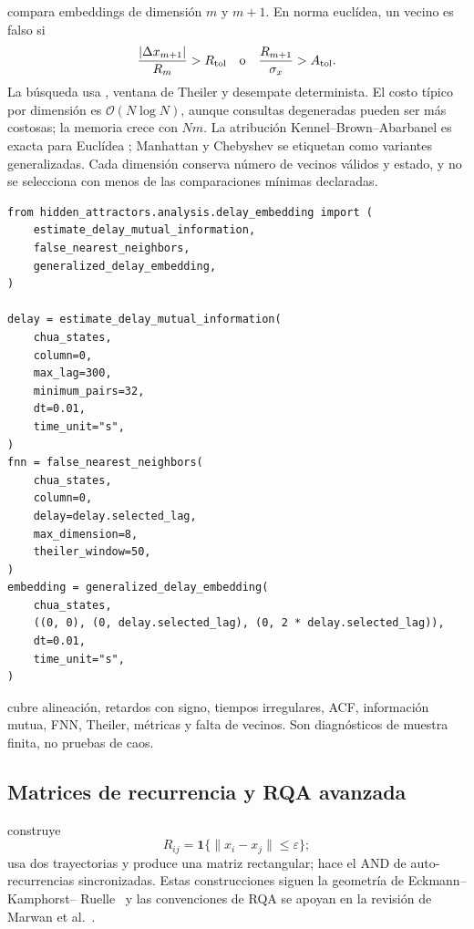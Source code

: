  compara embeddings de dimensión \(m\) y
\(m+1\). En norma euclídea, un vecino es falso si
\[
 \frac{|\Delta x_{m+1}|}{R_m}>R_{\rm tol}
 \quad\text{o}\quad
 \frac{R_{m+1}}{\sigma_x}>A_{\rm tol}.
\]
La búsqueda usa , ventana de Theiler y desempate
determinista. El costo típico por dimensión es \(\mathcal O(N\log N)\), aunque consultas
degeneradas pueden ser más costosas; la memoria crece con \(Nm\). La atribución
Kennel--Brown--Abarbanel es exacta para Euclídea
\cite{KennelEtAl1992}; Manhattan y Chebyshev se etiquetan como variantes
generalizadas. Cada dimensión conserva número de vecinos válidos y estado, y no
se selecciona con menos de las comparaciones mínimas declaradas.

\begin{verbatim}
from hidden_attractors.analysis.delay_embedding import (
    estimate_delay_mutual_information,
    false_nearest_neighbors,
    generalized_delay_embedding,
)

delay = estimate_delay_mutual_information(
    chua_states,
    column=0,
    max_lag=300,
    minimum_pairs=32,
    dt=0.01,
    time_unit="s",
)
fnn = false_nearest_neighbors(
    chua_states,
    column=0,
    delay=delay.selected_lag,
    max_dimension=8,
    theiler_window=50,
)
embedding = generalized_delay_embedding(
    chua_states,
    ((0, 0), (0, delay.selected_lag), (0, 2 * delay.selected_lag)),
    dt=0.01,
    time_unit="s",
)
\end{verbatim}
 cubre alineación, retardos
con signo, tiempos irregulares, ACF, información mutua, FNN, Theiler, métricas y
falta de vecinos. Son diagnósticos de muestra finita, no pruebas de caos.

\subsection{Matrices de recurrencia y RQA avanzada}
\label{sec:recurrence-advanced}

 construye
\[
 R_{ij}=\mathbf1\{\|x_i-x_j\|\le\varepsilon\};
\]
 usa dos trayectorias y produce una matriz
rectangular;  hace el AND de auto-recurrencias
sincronizadas. Estas construcciones siguen la geometría de Eckmann--Kamphorst--
Ruelle~\cite{EckmannRecurrence1987} y las convenciones de RQA se apoyan en la
revisión de Marwan et al.~\cite{MarwanEtAl2007}.

